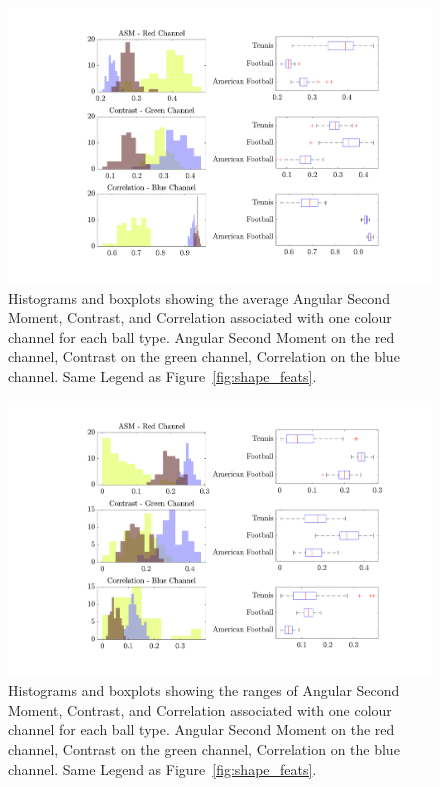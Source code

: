 \documentclass[conference]{IEEEtran}
\begin{document}
        \begin{figure}[htbp]
            \centering
            \captionsetup{singlelinecheck=off}
            \includegraphics[width=\columnwidth]{figures/averages.pdf}
            \caption[]{Histograms and boxplots showing the average Angular Second Moment, Contrast, and Correlation associated with one colour channel for each ball type.
                Angular Second Moment on the red channel,
                Contrast on the green channel,
                Correlation on the blue channel. Same Legend as Figure~\ref{fig:shape_feats}.~\label{fig:tex_feats_avgs}
            }
        \end{figure}

        \begin{figure}[htbp]
            \centering
            \includegraphics[width=\columnwidth]{figures/ranges.pdf}
            \caption[]{Histograms and boxplots showing the ranges of Angular Second Moment, Contrast, and Correlation associated with one colour channel for each ball type.
                Angular Second Moment on the red channel,
                Contrast on the green channel,
                Correlation on the blue channel. Same Legend as Figure~\ref{fig:shape_feats}.~\label{fig:tex_feats_ranges}
            }
        \end{figure}
\end{document}
